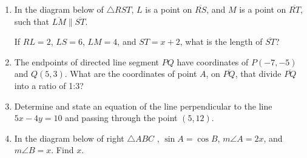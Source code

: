 \documentclass[12pt, oneside]{article}
\begin{document}
\begin{enumerate}[itemsep=2cm]
\newpage
\item In the diagram below of $\triangle RST$, $L$ is a point on $\overline{RS}$, and $M$ is a point on $\overline{RT}$, such that $\overline{LM} \parallel \overline{ST}$.
\begin{center}
\end{center}
If $RL=2$, $LS=6$, $LM=4$, and $ST=x+2$, what is the length of $\overline{ST}$?

\item The endpoints of directed line segment $PQ$ have coordinates of
$P(-7,-5)$ and $Q(5,3)$. What are the coordinates of point $A$, on $\overline{PQ}$,
that divide $\overline{PQ}$ into a ratio of 1:3?

\item Determine and state an equation of the line perpendicular to the line\\ $5x-4y=10$ and passing through the point $(5,12)$.

\item In the diagram below of right $\triangle ABC$ , $\sin A =\cos B$, $m\angle A = 2x$, and $m\angle B = x$. Find $x$.
  \begin{center}
  \end{center}

\end{enumerate}
\end{document}
